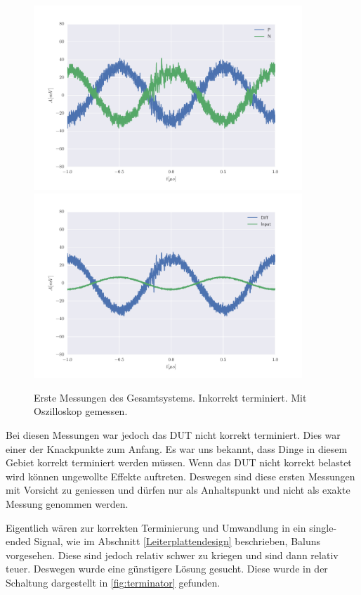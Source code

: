 \begin{figure}[ht]
\begin{center}
    \includegraphics[width=0.9\textwidth]{data/images/messungen/zweite_messung_NP}
    \includegraphics[width=0.9\textwidth]{data/images/messungen/zweite_messung_INOUT}
    \caption{Erste Messungen des Gesamtsystems. Inkorrekt terminiert. Mit Oszilloskop gemessen.}
    \label{fig:messungen_zweite}
\end{center}
\end{figure}

Bei diesen Messungen war jedoch das DUT nicht korrekt terminiert. Dies war einer der Knackpunkte zum Anfang. Es war uns bekannt, dass Dinge in diesem Gebiet korrekt terminiert werden müssen. Wenn das DUT nicht korrekt belastet wird können ungewollte Effekte auftreten. Deswegen sind diese ersten Messungen mit Vorsicht zu geniessen und dürfen nur als Anhaltspunkt und nicht als exakte Messung genommen werden.

Eigentlich wären zur korrekten Terminierung und Umwandlung in ein single-ended Signal, wie im Abschnitt \ref{Leiterplattendesign} beschrieben, Baluns vorgesehen. Diese sind jedoch relativ schwer zu kriegen und sind dann relativ teuer. Deswegen wurde eine günstigere Lösung gesucht. Diese wurde in der Schaltung dargestellt in \ref{fig:terminator} gefunden.

